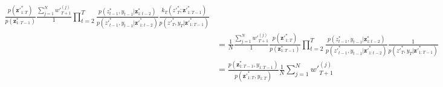 \documentclass[11pt]{article}
\newcommand{\z}{\mathbf{z}}
\begin{document}
\begin{align*}
{}
\frac{p({\z'}_{1:T}^*)}{p({\z}_{1:T-1}^*)}
\frac{
\sum_{j=1}^N {w'}_{T+1}^{(j)}
}{
1
}
\prod_{t=2}^T \frac{p(z_{t-1}^*, y_{t-1} | {\z}_{1:t-2}^{*})}{p({z'}_{t-1}^*, y_{t-1} | {\z'}_{1:t-2}^*)}
\frac{
k_T({z'}_{T}^*; {\z'}_{1:T-1}^*)
}{
p({z'}_{T}^*, y_T| {\z'}_{1:T-1}^*)
}\\
&=
\frac{1}{N}
\frac{
\sum_{j=1}^N {w'}_{T+1}^{(j)}
}{
1
}
\frac{p({\z'}_{1:T}^*)}{p({\z}_{1:T-1}^*)}
\prod_{t=2}^T \frac{p(z_{t-1}^*, y_{t-1} | {\z}_{1:t-2}^{*})}{p({z'}_{t-1}^*, y_{t-1} | {\z'}_{1:t-2}^*)}
\frac{
1
}{
p({z'}_{T}^*, y_T| {\z'}_{1:T-1}^*)
}\\
&= \frac{p({\z}_{1:T-1}^*, y_{1:T-1})}{p({\z'}_{1:T}^*, y_{1:T})} \frac{1}{N} \sum_{j=1}^N {w'}_{T+1}^{(j)}
\end{align*}

 
\end{document}
